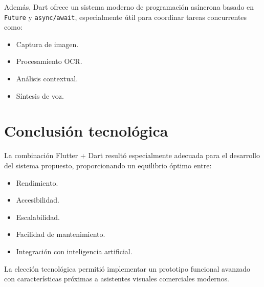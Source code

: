 Además, Dart ofrece un sistema moderno de programación asíncrona basado en \texttt{Future} y \texttt{async/await}, especialmente útil para coordinar tareas concurrentes como:

\begin{itemize}[noitemsep]
	\item Captura de imagen.
	\item Procesamiento OCR.
	\item Análisis contextual.
	\item Síntesis de voz.
\end{itemize}

\section{Conclusión tecnológica}

La combinación Flutter + Dart resultó especialmente adecuada para el desarrollo del sistema propuesto, proporcionando un equilibrio óptimo entre:

\begin{itemize}[noitemsep]
	\item Rendimiento.
	\item Accesibilidad.
	\item Escalabilidad.
	\item Facilidad de mantenimiento.
	\item Integración con inteligencia artificial.
\end{itemize}

La elección tecnológica permitió implementar un prototipo funcional avanzado con características próximas a asistentes visuales comerciales modernos.

